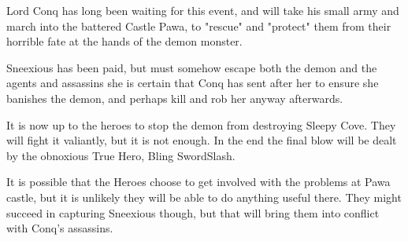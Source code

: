 \documentclass[11pt, twoside, titlepage, a4paper]{report}
\begin{document}
Lord Conq has long been waiting for this event, and will take his small army and march into the battered Castle Pawa, to "rescue" and "protect" them from their horrible fate at the hands of the demon monster.

Sneexious has been paid, but must somehow escape both the demon and the agents and assassins she is certain that Conq has sent after her to ensure she banishes the demon, and perhaps kill and rob her anyway afterwards.

It is now up to the heroes to stop the demon from destroying Sleepy Cove. They will fight it valiantly, but it is not enough. In the end the final blow will be dealt by the obnoxious True Hero, Bling SwordSlash.

It is possible that the Heroes choose to get involved with the problems at Pawa castle, but it is unlikely they will be able to do anything useful there. They might succeed in capturing Sneexious though, but that will bring them into conflict with Conq's assassins.
\end{document}
